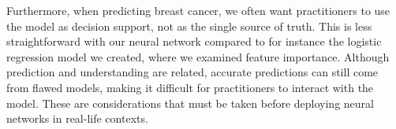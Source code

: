 Furthermore, when predicting breast cancer, we often want practitioners to use the model as decision support, not as the single source of truth. This is less straightforward with our neural network compared to for instance the logistic regression model we created, where we examined feature importance. Although prediction and understanding are related, accurate predictions can still come from flawed models, making it difficult for practitioners to interact with the model. These are considerations that must be taken before deploying neural networks in real-life contexts. 







